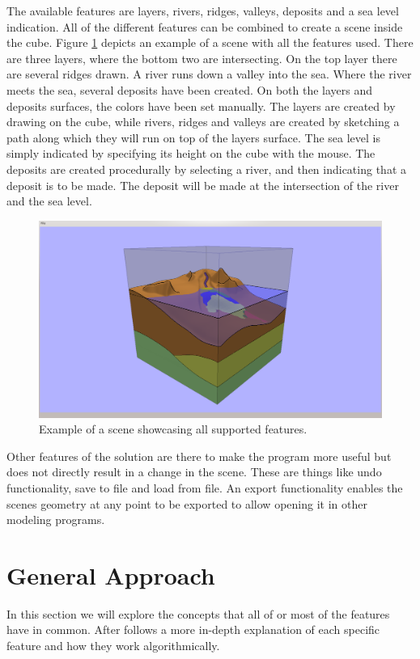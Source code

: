 \documentclass[a4paper,12pt]{report}
\begin{document}
The available features are layers, rivers, ridges, valleys, deposits and a sea level indication. All of the different features can be combined to create a scene inside the cube. Figure \ref{fig:allFeatures} depicts an example of a scene with all the features used. There are three layers, where the bottom two are intersecting. On the top layer there are several ridges drawn. A river runs down a valley into the sea. Where the river meets the sea, several deposits have been created. On both the layers and deposits surfaces, the colors have been set manually. The layers are created by drawing on the cube, while rivers, ridges and valleys are created by sketching a path along which they will run on top of the layers surface. The sea level is simply indicated by specifying its height on the cube with the mouse. The deposits are created procedurally by selecting a river, and then indicating that a deposit is to be made. The deposit will be made at the intersection of the river and the sea level.

\begin{figure}
 \includegraphics[trim = 50mm 5mm 50mm 7mm, clip,width=\linewidth]{thesis/results/allFeatures.png}
 \caption{Example of a scene showcasing all supported features.}
 \label{fig:allFeatures}
\end{figure}


Other features of the solution are there to make the program more useful but does not directly result in a change in the scene. These are things like undo functionality, save to file and load from file. An export functionality enables the scenes geometry at any point to be exported to allow opening it in other modeling programs.

\section{General Approach}
\label{subsec:generaldesign}
In this section we will explore the concepts that all of or most of the features have in common. After follows a more in-depth explanation of each specific feature and how they work algorithmically.
\end{document}

